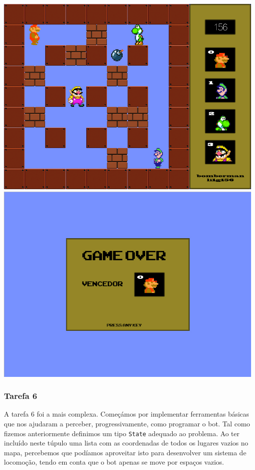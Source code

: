 \documentclass[a4paper]{article}
\begin{document}
\begin{center}
\includegraphics[scale=0.20]{game.jpg} \includegraphics[scale=0.20]{over.jpg} 
\end{center}

\pagebreak

\subsubsection{Tarefa 6}
\hspace{0.54cm}A tarefa 6 foi a mais complexa. Começámos por implementar ferramentas básicas que nos ajudaram a perceber, 
    progressivamente, como programar o bot. Tal como fizemos anteriormente definimos um tipo \texttt{State} adequado
    ao problema. Ao ter incluído neste túpulo uma lista com as coordenadas de todos os lugares vazios no mapa,
    percebemos que podíamos aproveitar isto para desenvolver um sistema de locomoção, tendo em conta que o bot apenas 
    se move por espaços vazios.
    \linebreak
    
\end{document}
